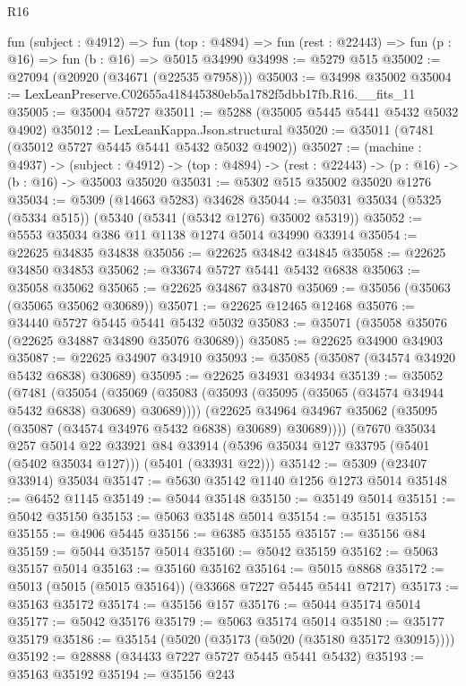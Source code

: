 \begin{lexlean}{R16}
\begin{coremodule}
  fun (subject : @4912) =>
  fun (top : @4894) => fun (rest : @22443) => fun (p : @16) => fun (b : @16) => @5015 @34990
@34998 := @5279 @515
@35002 := @27094 (@20920 (@34671 (@22535 @7958)))
@35003 := @34998 @35002
@35004 := LexLeanPreserve.C02655a418445380eb5a1782f5dbb17fb.R16.__fits_11
@35005 := @35004 @5727
@35011 := @5288 (@35005 @5445 @5441 @5432 @5032 @4902)
@35012 := LexLeanKappa.Json.structural
@35020 := @35011 (@7481 (@35012 @5727 @5445 @5441 @5432 @5032 @4902))
@35027 := (machine : @4937) ->
  (subject : @4912) -> (top : @4894) -> (rest : @22443) -> (p : @16) -> (b : @16) -> @35003 @35020
@35031 := @5302 @515 @35002 @35020 @1276
@35034 := @5309 (@14663 @5283) @34628
@35044 := @35031 @35034 (@5325 (@5334 @515)) (@5340 (@5341 (@5342 @1276) @35002 @5319))
@35052 := @5553 @35034 @386 @11 @1138 @1274 @5014 @34990 @33914
@35054 := @22625 @34835 @34838
@35056 := @22625 @34842 @34845
@35058 := @22625 @34850 @34853
@35062 := @33674 @5727 @5441 @5432 @6838
@35063 := @35058 @35062
@35065 := @22625 @34867 @34870
@35069 := @35056 (@35063 (@35065 @35062 @30689))
@35071 := @22625 @12465 @12468
@35076 := @34440 @5727 @5445 @5441 @5432 @5032
@35083 := @35071 (@35058 @35076 (@22625 @34887 @34890 @35076 @30689))
@35085 := @22625 @34900 @34903
@35087 := @22625 @34907 @34910
@35093 := @35085 (@35087 (@34574 @34920 @5432 @6838) @30689)
@35095 := @22625 @34931 @34934
@35139 := @35052
    (@7481
      (@35054
        (@35069 (@35083 (@35093 (@35095 (@35065 (@34574 @34944 @5432 @6838) @30689) @30689))))
        (@22625 @34964 @34967 @35062 (@35095 (@35087 (@34574 @34976 @5432 @6838) @30689) @30689))))
    (@7670
      @35034
      @257
      @5014
      @22
      @33921
      @84
      @33914
      (@5396 @35034 @127 @33795 (@5401 (@5402 @35034 @127)))
      (@5401 (@33931 @22)))
@35142 := @5309 (@23407 @33914) @35034
@35147 := @5630 @35142 @1140 @1256 @1273 @5014
@35148 := @6452 @1145
@35149 := @5044 @35148
@35150 := @35149 @5014
@35151 := @5042 @35150
@35153 := @5063 @35148 @5014
@35154 := @35151 @35153
@35155 := @4906 @5445
@35156 := @6385 @35155
@35157 := @35156 @84
@35159 := @5044 @35157 @5014
@35160 := @5042 @35159
@35162 := @5063 @35157 @5014
@35163 := @35160 @35162
@35164 := @5015 @8868
@35172 := @5013 (@5015 (@5015 @35164)) (@33668 @7227 @5445 @5441 @7217)
@35173 := @35163 @35172
@35174 := @35156 @157
@35176 := @5044 @35174 @5014
@35177 := @5042 @35176
@35179 := @5063 @35174 @5014
@35180 := @35177 @35179
@35186 := @35154 (@5020 (@35173 (@5020 (@35180 @35172 @30915))))
@35192 := @28888 (@34433 @7227 @5727 @5445 @5441 @5432)
@35193 := @35163 @35192
@35194 := @35156 @243

\end{coremodule}
\end{lexlean}
